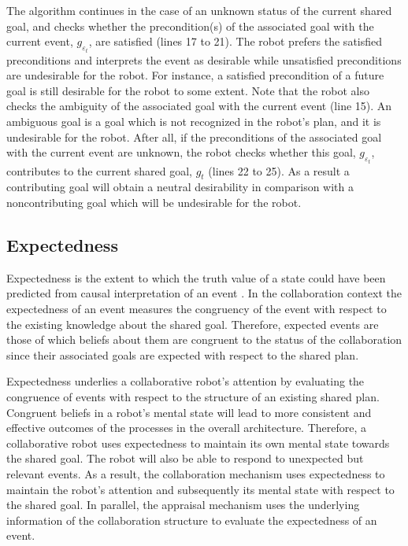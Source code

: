 \documentclass[letterpaper]{article}
\begin{document}
The algorithm continues in the case of an unknown status of the current shared
goal, and checks whether the precondition(s) of the associated goal with the
current event, $\mathit{g}_{\varepsilon_t}$, are satisfied (lines 17 to 21).
The robot prefers the satisfied preconditions and interprets the event as
desirable while unsatisfied preconditions are undesirable for the robot. For
instance, a satisfied precondition of a future goal is still desirable for the
robot to some extent. Note that the robot also checks the ambiguity of the
associated goal with the current event (line 15). An ambiguous goal is a goal
which is not recognized in the robot's plan, and it is undesirable for the
robot. After all, if the preconditions of the associated goal with the current
event are unknown, the robot checks whether this goal,
$\mathit{g}_{\varepsilon_t}$, contributes to the current shared goal,
$\mathit{g}_{t}$ (lines 22 to 25). As a result a contributing goal will obtain a
neutral desirability in comparison with a noncontributing goal which will be
undesirable for the robot.

\subsection{Expectedness}

Expectedness is the extent to which the truth value of a state could have been
predicted from causal interpretation of an event
\cite{marsella:ema-process-model}. In the collaboration context the expectedness
of an event measures the congruency of the event with respect to the existing
knowledge about the shared goal. Therefore, expected events are those of which
beliefs about them are congruent to the status of the collaboration since their
associated goals are expected with respect to the shared plan.

Expectedness underlies a collaborative robot's attention by evaluating the
congruence of events with respect to the structure of an existing shared plan.
Congruent beliefs in a robot's mental state will lead to more consistent and
effective outcomes of the processes in the overall architecture. Therefore,
a collaborative robot uses expectedness to maintain its own mental state towards
the shared goal. The robot will also be able to respond to unexpected but
relevant events. As a result, the collaboration mechanism uses expectedness to
maintain the robot's attention and subsequently its mental state with respect to
the shared goal. In parallel, the appraisal mechanism uses the underlying
information of the collaboration structure to evaluate the expectedness of an
event.
\end{document}
